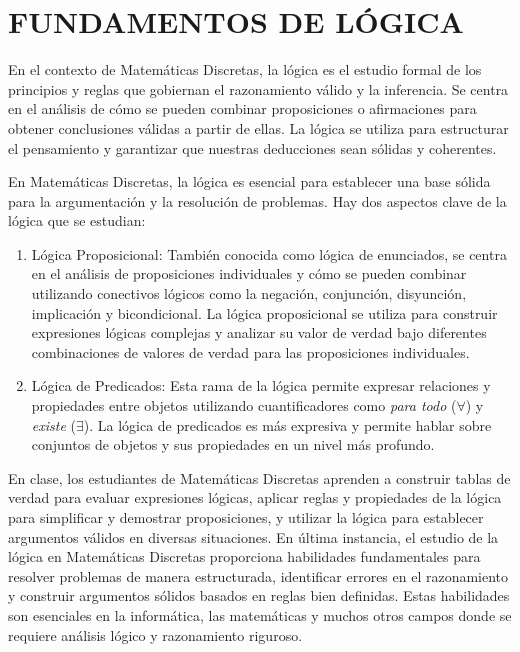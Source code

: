 \chapterspaceabove{6.75cm} %
\chapterspacebelow{7.25cm} %


\chapter{FUNDAMENTOS DE LÓGICA}\label{chap:1}

En el contexto de Matemáticas Discretas, la lógica es el estudio formal de los principios y reglas que gobiernan el razonamiento válido y la inferencia. Se centra en el análisis de cómo se pueden combinar proposiciones o afirmaciones para obtener conclusiones válidas a partir de ellas. La lógica se utiliza para estructurar el pensamiento y garantizar que nuestras deducciones sean sólidas y coherentes.

En Matemáticas Discretas, la lógica es esencial para establecer una base sólida para la argumentación y la resolución de problemas. Hay dos aspectos clave de la lógica que se estudian:

\begin{enumerate}
    \item Lógica Proposicional: También conocida como lógica de enunciados, se centra en el análisis de proposiciones individuales y cómo se pueden combinar utilizando conectivos lógicos como la negación, conjunción, disyunción, implicación y bicondicional. La lógica proposicional se utiliza para construir expresiones lógicas complejas y analizar su valor de verdad bajo diferentes combinaciones de valores de verdad para las proposiciones individuales.
    \item Lógica de Predicados: Esta rama de la lógica permite expresar relaciones y propiedades entre objetos utilizando cuantificadores como \emph{para todo} ($\forall$) y \emph{existe} ($\exists$). La lógica de predicados es más expresiva y permite hablar sobre conjuntos de objetos y sus propiedades en un nivel más profundo.
\end{enumerate}

En clase, los estudiantes de Matemáticas Discretas aprenden a construir tablas de verdad para evaluar expresiones lógicas, aplicar reglas y propiedades de la lógica para simplificar y demostrar proposiciones, y utilizar la lógica para establecer argumentos válidos en diversas situaciones. En última instancia, el estudio de la lógica en Matemáticas Discretas proporciona habilidades fundamentales para resolver problemas de manera estructurada, identificar errores en el razonamiento y construir argumentos sólidos basados en reglas bien definidas. Estas habilidades son esenciales en la informática, las matemáticas y muchos otros campos donde se requiere análisis lógico y razonamiento riguroso.


